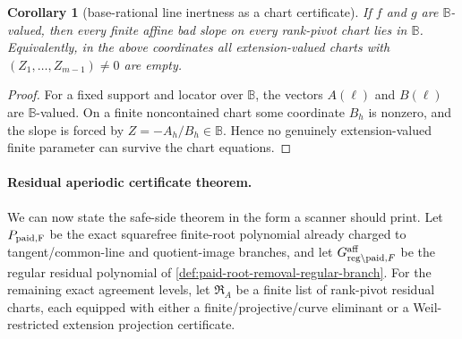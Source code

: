 \documentclass[11pt]{article}
\newtheorem{corollary}[corollary]{Corollary}
\theoremstyle{definition}
\theoremstyle{remark}
\newcommand{\B}{\mathbb{B}}
\begin{document}
\begin{corollary}[base-rational line inertness as a chart certificate]
\label{cor:base-rational-line-inertness-chart}
If $f$ and $g$ are $\B$-valued, then every finite affine bad slope on every
rank-pivot chart lies in $\B$.  Equivalently, in the above coordinates all
extension-valued charts with $(Z_1,\ldots,Z_{m-1})\ne0$ are empty.
\end{corollary}

\begin{proof}
For a fixed support and locator over $\B$, the vectors $A(\ell)$ and $B(\ell)$
are $\B$-valued.  On a finite noncontained chart some coordinate $B_h$ is
nonzero, and the slope is forced by
$Z=-A_h/B_h\in\B$.  Hence no genuinely extension-valued finite parameter can
survive the chart equations.
\end{proof}

\paragraph{Residual aperiodic certificate theorem.}
We can now state the safe-side theorem in the form a scanner should print.  Let
$P_{\rm paid,F}$ be the exact squarefree finite-root polynomial already charged
to tangent/common-line and quotient-image branches, and let
$G_{{\rm reg}\setminus{\rm paid},F}^{\rm aff}$ be the regular residual polynomial
of \cref{def:paid-root-removal-regular-branch}.  For the remaining exact
agreement levels, let $\mathfrak R_A$ be a finite list of rank-pivot residual
charts, each equipped with either a finite/projective/curve eliminant or a
Weil-restricted extension projection certificate.
\end{document}
